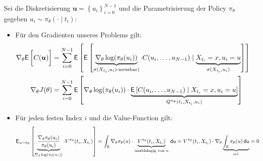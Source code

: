 \documentclass[a4paper, 12pt]{scrartcl}
\newcommand{\du}{\thinspace \mathsf{du}}
\begin{document}
%
\begin{beweis}
    Sei die Diskretisierung $\bm{u} = \left\{ u_i \right\}_{i=0}^{N-1}$ 
    und die Parametrisierung 
    der Policy $\pi_{\theta}$ gegeben $u_i \sim \pi_{\theta}(\cdot \mid t_i)$:
    \begin{itemize}
        \item[1.] Für den Gradienten unseres Problems gilt:
        \begin{align*}
            \nabla_{\theta} 
            \mathsf{E}
            \left[
                \vphantom{\int}
                C(\bm{u})
            \right]
            &=
            \sum_{i=0}^{N-1}   
            \mathsf{E}
            \left[
                \mathsf{E}
                \left[
                    \underbrace{
                        \nabla_{\theta} \log(\pi_{\theta}(u_i))
                    }_{
                        \sigma(X_{t_i},u_i) \text{-messbar})
                    }
                    \cdot
                    C(u_i, \ldots, u_{N-1})
                    \mid
                    \underbrace{
                        X_{t_i} = x, u_i = u
                    }_{
                        \sigma(X_{t_i},u_i)
                    }
                \right]
            \right]
            \\
            \nabla_{\theta} J(\theta)
            &=
            \sum_{i=0}^{N-1}
            \mathsf{E}
            \left[
                \nabla_{\theta} \log(\pi_{\theta}(u_i))
                \cdot
                \underbrace{
                    \mathsf{E}
                    \left[
                        C(u_i, \ldots, u_{N-1})
                        \mid
                        X_{t_i} = x, u_i = u
                    \right]
                }_{
                    Q^{\pi_{\theta}}(t_i,X_{t_i}, u_i)
                }
            \right]
        \end{align*}

        \item[2.] Für jeden festen Index $i$ und die Value-Function gilt:
        \begin{align*}
            \mathsf{E}_{u \sim \pi_{\theta}}
            \left[
                \underbrace{
                    \frac{\nabla_{\theta} \pi_{\theta}(u_i)}{\pi_{\theta}(u_i)}
                }_{
                    \nabla_{\theta} \log(\pi_{\theta}(u_i))
                }
                \cdot
                V^{\pi_{\theta}}(t_i,X_{t_i})
            \right]
            = \int_{\mathbb{R}} \nabla_{\theta} \pi_{\theta}(u) \cdot 
            \underbrace{
                V^{\pi_{\theta}}(t_i,X_{t_i})
            }_{
                \text{unabhängig von } u
            }
            \du
            =
            V^{\pi_{\theta}}(t_i,X_{t_i})
            \cdot
            \nabla_{\theta}
            \underbrace{
                \int_{\mathbb{R}} \pi_{\theta}(u) \du
            }_{
                = 1
            }
            = 0
        \end{align*}


\end{itemize}
\end{beweis}
\end{document}
